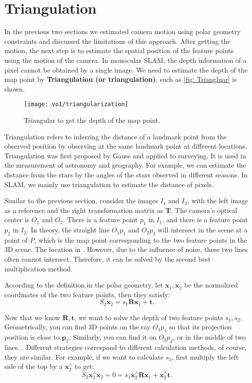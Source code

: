 \section{Triangulation}
In the previous two sections we estimated camera motion using polar geometry constraints and discussed the limitations of this approach. After getting the motion, the next step is to estimate the spatial position of the feature points using the motion of the camera. In monocular SLAM, the depth information of a pixel cannot be obtained by a single image. We need to estimate the depth of the map point by \textbf{Triangulation (or triangulation)}, such as \autoref{fig: Triangluar} is shown.

\begin{figure}[!ht]
\centering
\texttt{[image: vo1/triangularization]}
\caption{Triangular to get the depth of the map point. }
\label{fig:triangluar}
\end{figure}

Triangulation refers to inferring the distance of a landmark point from the observed position by observing at the same landmark point at different locations. Triangulation was first proposed by Gauss and applied to surveying. It is used in the measurement of astronomy and geography. For example, we can estimate the distance from the stars by the angles of the stars observed in different seasons. In SLAM, we mainly use triangulation to estimate the distance of pixels.

Similar to the previous section, consider the images $I_{1}$ and $I_{2}$, with the left image as a reference and the right transformation matrix as $\bm{T}$. The camera's optical center is $O_{1}$ and $O_{2}$. There is a feature point $p_{1}$ in $I_{1}$, and there is a feature point $p_{2}$ in $I_{2}$. In theory, the straight line $O_{1}p_{1}$ and $O_{2}p_{2}$ will intersect in the scene at a point of $P$, which is the map point corresponding to the two feature points in the 3D scene. The location in . However, due to the influence of noise, these two lines often cannot intersect. Therefore, it can be solved by the second best multiplication method.

According to the definition in the polar geometry, let $\bm{x}_1, \bm{x}_2$ be the normalized coordinates of the two feature points, then they satisfy:
\begin{equation}
S_2 \bm{x}_2 = s_1 \bm{R} \bm{x}_1 + \bm{t}.
\end{equation}

Now that we know $\bm{R}, \bm{t}$, we want to solve the depth of two feature points $s_1, s_2$. Geometrically, you can find 3D points on the ray $O_1 p_1$ so that its projection position is close to $\bm{p}_2$. Similarly, you can find it on $O_2 p_2$, or in the middle of two lines. . Different strategies correspond to different calculation methods, of course, they are similar. For example, if we want to calculate $s_1$, first multiply the left side of the top by a $\bm{x}_2^\wedge$ to get:
\begin{equation}
\label{eq:x1tox2}
S_2 \bm{x}_2^\wedge \bm{x}_2 = 0 = s_1 \bm{x}_2^\wedge \bm{R} \bm{x}_1 + \bm{x}_2^\wedge \bm{t}.
\end{equation}

